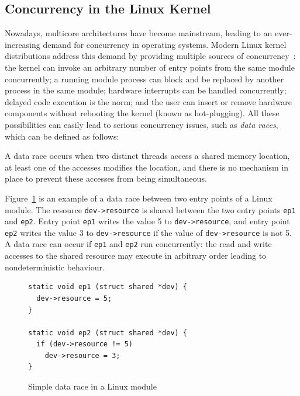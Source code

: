 \subsection{Concurrency in the Linux Kernel}
\label{concurrency}

Nowadays, multicore architectures have become mainstream, leading to an ever-increasing demand for concurrency in operating systems. Modern Linux kernel distributions address this demand by providing multiple sources of concurrency~\cite{corbet2005linux}: the kernel can invoke an arbitrary number of entry points from the same module concurrently; a running module process can block and be replaced by another process in the same module; hardware interrupts can be handled concurrently; delayed code execution is the norm; and the user can insert or remove hardware components without rebooting the kernel (known as hot-plugging). All these possibilities can easily lead to serious concurrency issues, such as \emph{data races}, which can be defined as follows:

\begin{definition}
\label{definition:datarace}
A data race occurs when two distinct threads access a shared memory location, at least one of the accesses modifies the location, and there is no mechanism in place to prevent these accesses from being simultaneous.
\end{definition}

Figure~\ref{data_race_example} is an example of a data race between two entry points of a Linux module. The resource \texttt{dev->resource} is shared between the two entry points \texttt{ep1} and \texttt{ep2}. Entry point \texttt{ep1} writes the value 5 to \texttt{dev->resource}, and entry point \texttt{ep2} writes the value 3 to \texttt{dev->resource} if the value of \texttt{dev->resource} is not 5. A data race can occur if \texttt{ep1} and \texttt{ep2} run concurrently: the read and write accesses to the shared resource may execute in arbitrary order leading to nondeterministic behaviour.

\begin{figure}[!h]
\centering
\begin{lstlisting}
static void ep1 (struct shared *dev) {
  dev->resource = 5;
}

static void ep2 (struct shared *dev) {
  if (dev->resource != 5)
    dev->resource = 3;
}
\end{lstlisting}
\caption{Simple data race in a Linux module}
\label{data_race_example}
\end{figure}

